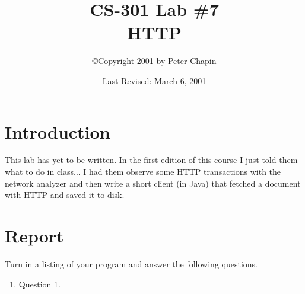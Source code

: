 \documentclass{article}
\begin{document}
\title{CS-301 Lab \#7\\HTTP}
\author{\copyright Copyright 2001 by Peter Chapin}
\date{Last Revised: March 6, 2001}
\maketitle

\section{Introduction}

This lab has yet to be written. In the first edition of this course I
just told them what to do in class... I had them observe some HTTP
transactions with the network analyzer and then write a short client (in
Java) that fetched a document with HTTP and saved it to disk.

\section{Report}

Turn in a listing of your program and answer the following questions.

\begin{enumerate}

\item Question 1.

\end{enumerate}
\end{document}
